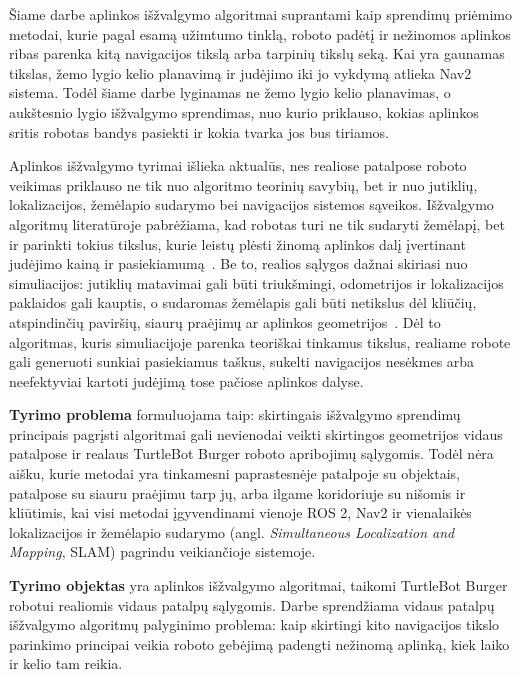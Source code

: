\documentclass[]{VUMIFTemplateClass}
\begin{document}
Šiame darbe aplinkos išžvalgymo algoritmai suprantami kaip sprendimų priėmimo metodai, kurie pagal esamą užimtumo tinklą, roboto padėtį ir nežinomos
aplinkos ribas parenka kitą navigacijos tikslą arba tarpinių tikslų seką. Kai yra gaunamas tikslas, žemo lygio kelio planavimą ir judėjimo iki jo
vykdymą atlieka Nav2 sistema. Todėl šiame darbe lyginamas ne žemo lygio kelio planavimas, o aukštesnio lygio išžvalgymo
sprendimas, nuo kurio priklauso, kokias aplinkos sritis robotas bandys pasiekti ir kokia tvarka jos bus tiriamos.

Aplinkos išžvalgymo tyrimai išlieka aktualūs, nes realiose patalpose roboto veikimas priklauso ne tik nuo algoritmo teorinių savybių, bet ir nuo jutiklių,
lokalizacijos, žemėlapio sudarymo bei navigacijos sistemos sąveikos. Išžvalgymo algoritmų literatūroje pabrėžiama, kad robotas turi ne tik sudaryti žemėlapį,
bet ir parinkti tokius tikslus, kurie leistų plėsti žinomą aplinkos dalį įvertinant judėjimo kainą ir pasiekiamumą~\cite{yamauchi1997frontier,keidar2014frontier,pimentel2016infogain}.
Be to, realios sąlygos dažnai skiriasi nuo simuliacijos: jutiklių matavimai gali būti
triukšmingi, odometrijos ir lokalizacijos paklaidos gali kauptis, o sudaromas žemėlapis gali būti netikslus dėl kliūčių, atspindinčių paviršių, siaurų
praėjimų ar aplinkos geometrijos~\cite{SLAM-toolbox,xu2022explorebench}. Dėl to algoritmas, kuris simuliacijoje parenka teoriškai tinkamus tikslus, realiame robote gali generuoti sunkiai
pasiekiamus taškus, sukelti navigacijos nesėkmes arba neefektyviai kartoti judėjimą tose pačiose aplinkos dalyse.

\textbf{Tyrimo problema} formuluojama taip: skirtingais išžvalgymo sprendimų principais pagrįsti algoritmai gali nevienodai veikti skirtingos geometrijos vidaus
patalpose ir realaus TurtleBot Burger roboto apribojimų sąlygomis. Todėl nėra aišku, kurie metodai yra tinkamesni paprastesnėje patalpoje su objektais,
patalpose su siauru praėjimu tarp jų, arba ilgame koridoriuje su nišomis ir kliūtimis, kai visi metodai įgyvendinami vienoje
ROS 2, Nav2 ir vienalaikės lokalizacijos ir žemėlapio sudarymo (angl. \textit{Simultaneous Localization and Mapping}, SLAM) pagrindu veikiančioje sistemoje.

\textbf{Tyrimo objektas} yra aplinkos išžvalgymo algoritmai, taikomi TurtleBot Burger robotui realiomis vidaus patalpų sąlygomis. Darbe sprendžiama vidaus patalpų
išžvalgymo algoritmų palyginimo problema: kaip skirtingi kito navigacijos tikslo parinkimo principai veikia roboto gebėjimą padengti nežinomą aplinką, kiek laiko ir
kelio tam reikia.
\end{document}
